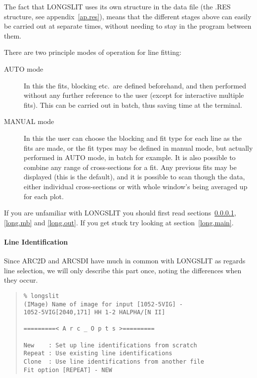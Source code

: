The fact that LONGSLIT uses its own structure in the data file (the
.RES structure, see appendix~\ref{ap.res}), means that the different
stages above can easily be carried out at separate times, without
needing to stay in the program between them.

There are two principle modes of operation for line fitting:

\begin{description}

\item[AUTO mode] In this the fits, blocking etc.\ are defined
beforehand, and then performed without any further reference to the
user (except for interactive multiple fits).
This can be carried out in batch, thus saving time at the terminal.

\item[MANUAL mode] In this the user can choose the blocking and fit
type for each line as the fits are made, or the fit types may be
defined in manual mode, but actually performed in AUTO mode, in batch
for example.
It is also possible to combine any range of cross-sections for a fit.
Any previous fits may be displayed (this is the default), and it is
possible to scan though the data, either individual cross-sections or
with whole window's being averaged up for each plot.

\end{description}

If you are unfamiliar with LONGSLIT you should first read
sections~\ref{long.id}, \ref{long.mb} and \ref{long.out}.
If you get stuck try looking at section~\ref{long.main}.

\paragraph{Line Identification}
\label{long.id}

Since ARC2D and ARCSDI have much in common with LONGSLIT as regards
line selection, we will only describe this part once, noting the
differences when they occur.

\begin{quote}\begin{verbatim}
% longslit
(IMage) Name of image for input [1052-5VIG] -
1052-5VIG[2040,171] HH 1-2 HALPHA/[N II]

=========< A r c _ O p t s >=========
 
New    : Set up line identifications from scratch
Repeat : Use existing line identifications
Clone  : Use line identifications from another file
Fit option [REPEAT] - NEW
\end{verbatim}\end{quote}

